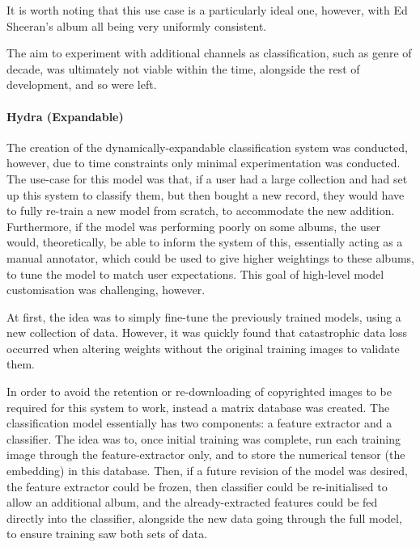                 It is worth noting that this use case is a particularly ideal one, however, with Ed Sheeran's album all being very uniformly consistent.
    
                The aim to experiment with additional channels as classification, such as genre of decade, was ultimately not viable within the time, alongside the rest of development, and so were left.
    
                \paragraph{Hydra (Expandable)}
    
                The creation of the dynamically-expandable classification system was conducted, however, due to time constraints only minimal experimentation was conducted. The use-case for this model was that, if a user had a large collection and had set up this system to classify them, but then bought a new record, they would have to fully re-train a new model from scratch, to accommodate the new addition. Furthermore, if the model was performing poorly on some albums, the user would, theoretically, be able to inform the system of this, essentially acting as a manual annotator, which could be used to give higher weightings to these albums, to tune the model to match user expectations. This goal of high-level model customisation was challenging, however.
    
                At first, the idea was to simply fine-tune the previously trained models, using a new collection of data. However, it was quickly found that catastrophic data loss occurred when altering weights without the original training images to validate them.
    
                In order to avoid the retention or re-downloading of copyrighted images to be required for this system to work, instead a matrix database was created. The classification model essentially has two components: a feature extractor and a classifier. The idea was to, once initial training was complete, run each training image through the feature-extractor only, and to store the numerical tensor (the embedding) in this database. Then, if a future revision of the model was desired, the feature extractor could be frozen, then classifier could be re-initialised to allow an additional album, and the already-extracted features could be fed directly into the classifier, alongside the new data going through the full model, to ensure training saw both sets of data.
    
